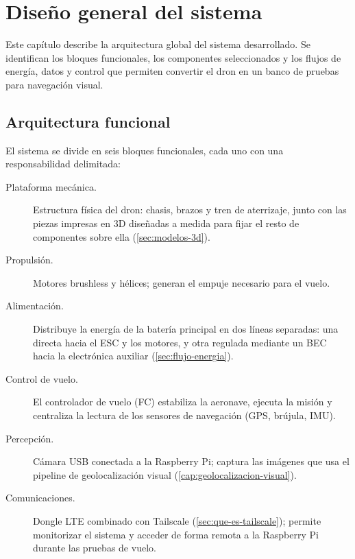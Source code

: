 
\chapter{Diseño general del sistema}
\label{cap:diseno-sistema}

\begin{Resumen}
Este capítulo describe la arquitectura global del sistema desarrollado. Se identifican los bloques funcionales, los componentes seleccionados y los flujos de energía, datos y control que permiten convertir el dron en un banco de pruebas para navegación visual.
\end{Resumen}

\section{Arquitectura funcional}
\label{sec:arquitectura-funcional}

El sistema se divide en seis bloques funcionales, cada uno con una responsabilidad delimitada:

\begin{description}
\item[Plataforma mecánica.] Estructura física del dron: chasis, brazos y tren de aterrizaje, junto con las piezas impresas en 3D diseñadas a medida para fijar el resto de componentes sobre ella (\autoref{sec:modelos-3d}).
\item[Propulsión.] Motores brushless y hélices; generan el empuje necesario para el vuelo.
\item[Alimentación.] Distribuye la energía de la batería principal en dos líneas separadas: una directa hacia el ESC y los motores, y otra regulada mediante un BEC hacia la electrónica auxiliar (\autoref{sec:flujo-energia}).
\item[Control de vuelo.] El controlador de vuelo (FC) estabiliza la aeronave, ejecuta la misión y centraliza la lectura de los sensores de navegación (GPS, brújula, IMU).
\item[Percepción.] Cámara USB conectada a la Raspberry Pi; captura las imágenes que usa el pipeline de geolocalización visual (\autoref{cap:geolocalizacion-visual}).
\item[Comunicaciones.] Dongle LTE combinado con Tailscale (\autoref{sec:que-es-tailscale}); permite monitorizar el sistema y acceder de forma remota a la Raspberry Pi durante las pruebas de vuelo.
\end{description}

